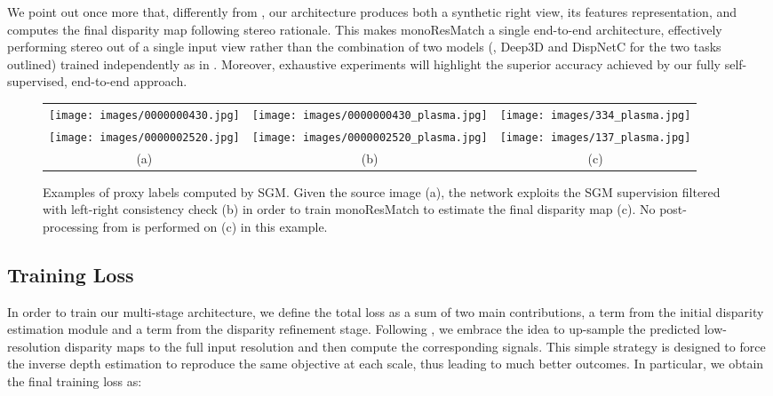 \documentclass[10pt,twocolumn,letterpaper]{article}
\begin{document}
We point out once more that, differently from \cite{luo2018single}, our architecture produces both a synthetic right view, \ie its features representation, and computes the final disparity map following stereo rationale. This makes monoResMatch a single end-to-end architecture, effectively performing stereo out of a single input view rather than the combination of two models (\ie, Deep3D \cite{xie2016deep3d} and DispNetC \cite{Mayer_2016_CVPR} for the two tasks outlined) trained independently as in \cite{luo2018supervised}. Moreover, exhaustive experiments will highlight the superior accuracy achieved by our fully self-supervised, end-to-end approach. 


\begin{figure*}
    \centering
    \renewcommand{\tabcolsep}{1pt}   
    \begin{tabular}{ccc}

        \texttt{[image: images/0000000430.jpg]}  &
        \texttt{[image: images/0000000430\_plasma.jpg]}  &
        \texttt{[image: images/334\_plasma.jpg]} 
        \\
        \texttt{[image: images/0000002520.jpg]}  &
        
        \texttt{[image: images/0000002520\_plasma.jpg]} &
        \texttt{[image: images/137\_plasma.jpg]}  
        \\
        (a) & (b) & (c)\\
    \end{tabular}
    \caption{Examples of proxy labels computed by SGM. Given the source image (a), the network exploits the SGM supervision filtered with left-right consistency check (b) in order to train monoResMatch to estimate the final disparity map (c). No post-processing from \cite{monodepth17} is performed on (c) in this example.}
    \label{fig:distillation}
\end{figure*}
 



\subsection{Training Loss}

In order to train our multi-stage architecture, we define the total loss as a sum of two main contributions, a  term from the initial disparity estimation module and a  term from the disparity refinement stage. Following \cite{godard2018digging}, we embrace the idea to up-sample the predicted low-resolution disparity maps to the full input resolution and then compute the corresponding signals. This simple strategy is designed to force the inverse depth estimation to reproduce the same objective at each scale, thus leading to much better outcomes. In particular, we obtain the final training loss as:
\end{document}

